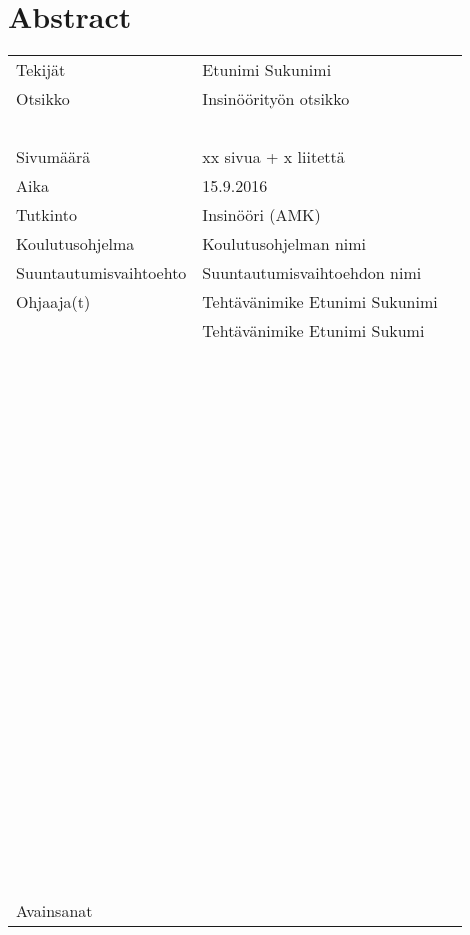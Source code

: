 
\chapter*{Abstract}
\thispagestyle{abstract}
\begin{table}[h]
  \begin{tabular}{| l | l | l |}
  \hline
  Tekijät & Etunimi Sukunimi \\
  Otsikko & Insinöörityön otsikko \\
  ~ & ~ \\
  Sivumäärä & xx sivua + x liitettä \\
  Aika & 15.9.2016 \\
  \hline
  Tutkinto & Insinööri (AMK) \\
  \hline
  Koulutusohjelma & Koulutusohjelman nimi \\
  \hline
  Suuntautumisvaihtoehto & Suuntautumisvaihtoehdon nimi \\
  \hline
  Ohjaaja(t) & Tehtävänimike Etunimi Sukunimi \\
  ~ & Tehtävänimike Etunimi Sukumi \\
  \hline
  ~ & ~ \\
  ~ & ~ \\
  ~ & ~ \\
  ~ & ~ \\
  ~ & ~ \\
  ~ & ~ \\
  ~ & ~ \\
  ~ & ~ \\
  ~ & ~ \\
  ~ & ~ \\
  ~ & ~ \\
  ~ & ~ \\
  ~ & ~ \\
  ~ & ~ \\
  ~ & ~ \\
  ~ & ~ \\
  ~ & ~ \\
  ~ & ~ \\
  ~ & ~ \\
  \hline
  Avainsanat & ~ \\
  \hline
  \end{tabular}
\end{table}
